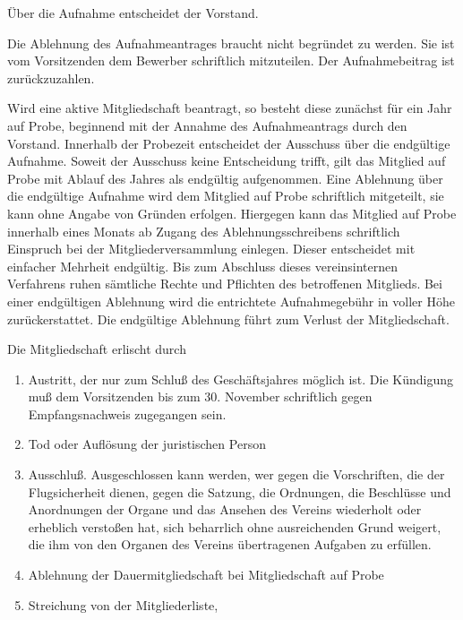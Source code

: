 \documentclass[10pt,a4paper,parskip=half]{scrartcl}
\begin{document}
\begin{contract}
    Über die Aufnahme entscheidet der Vorstand.
    
    Die Ablehnung des Aufnahmeantrages braucht nicht begründet zu werden.
    Sie ist vom Vorsitzenden dem Bewerber schriftlich mitzuteilen.
    Der Aufnahmebeitrag ist zurückzuzahlen.

    Wird eine aktive Mitgliedschaft beantragt,
    so besteht diese zunächst für ein Jahr auf Probe,
    beginnend mit der Annahme des Aufnahmeantrags durch den Vorstand.
    Innerhalb der Probezeit entscheidet der Ausschuss über die endgültige Aufnahme.
    Soweit der Ausschuss keine Entscheidung trifft,
    gilt das Mitglied auf Probe mit Ablauf des Jahres als endgültig aufgenommen.
    Eine Ablehnung über die endgültige Aufnahme wird dem Mitglied auf Probe schriftlich mitgeteilt,
    sie kann ohne Angabe von Gründen erfolgen.
    Hiergegen kann das Mitglied auf Probe innerhalb eines Monats ab Zugang des Ablehnungsschreibens schriftlich Einspruch bei der Mitgliederversammlung einlegen.
    Dieser entscheidet mit einfacher Mehrheit endgültig.
    Bis zum Abschluss dieses vereinsinternen Verfahrens ruhen sämtliche Rechte und Pflichten des betroffenen Mitglieds.
    Bei einer endgültigen Ablehnung wird die entrichtete Aufnahmegebühr in voller Höhe zurückerstattet.
    Die endgültige Ablehnung führt zum Verlust der Mitgliedschaft.
    
    \label{C:ErloeschenDerMitgliedschaft}
    Die Mitgliedschaft erlischt durch
    \begin{enumerate}[label=\alph*)]
      \item Austritt,
            der nur zum Schluß des Geschäftsjahres möglich ist.
            Die Kündigung muß dem Vorsitzenden bis zum 30. November schriftlich gegen Empfangsnachweis zugegangen sein.
      \item Tod oder Auflösung der juristischen Person
      \item{Ausschluß.} Ausgeschlossen kann werden,
            wer gegen die Vorschriften,
            die der Flugsicherheit dienen,
            gegen die Satzung,
            die Ordnungen,
            die Beschlüsse und Anordnungen der Organe und das Ansehen des Vereins wiederholt oder erheblich verstoßen hat,
            sich beharrlich ohne ausreichenden Grund weigert,
            die ihm von den Organen des Vereins übertragenen Aufgaben zu erfüllen.\label{S:Ausschluss}
      \item Ablehnung der Dauermitgliedschaft bei Mitgliedschaft auf Probe
      \item Streichung von der Mitgliederliste,            
    \end{enumerate}


\end{contract}
\end{document}
